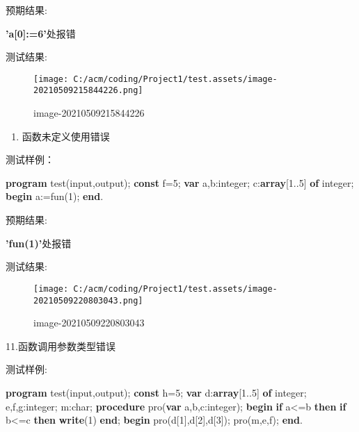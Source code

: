\documentclass[]{ctexart}
\newenvironment{Shaded}{}{}
\newcommand{\DataTypeTok}[1]{\textcolor[rgb]{0.56,0.13,0.00}{#1}}
\newcommand{\DecValTok}[1]{\textcolor[rgb]{0.25,0.63,0.44}{#1}}
\newcommand{\KeywordTok}[1]{\textcolor[rgb]{0.00,0.44,0.13}{\textbf{#1}}}
\newcommand{\NormalTok}[1]{#1}
\begin{document}
\begin{enumerate}
  预期结果:

  \textbf{'a{[}0{]}:=6'}处报错

  测试结果:

  \begin{figure}
  \centering
  \texttt{[image: C:/acm/coding/Project1/test.assets/image-20210509215844226.png]}
  \caption{image-20210509215844226}
  \end{figure}

  \begin{enumerate}
  \def\labelenumii{\arabic{enumii}.}
  \item
    函数未定义使用错误
  \end{enumerate}

  测试样例：

\begin{Shaded}
\begin{Highlighting}[]
\KeywordTok{program}\NormalTok{ test(input,output);  }
\KeywordTok{const}\NormalTok{ f=}\DecValTok{5}\NormalTok{;  }
\KeywordTok{var}\NormalTok{ a,b:}\DataTypeTok{integer}\NormalTok{;  }
\NormalTok{    c:}\KeywordTok{array}\NormalTok{[}\DecValTok{1}\NormalTok{..}\DecValTok{5}\NormalTok{] }\KeywordTok{of} \DataTypeTok{integer}\NormalTok{;    }
\KeywordTok{begin}  
\NormalTok{    a:=fun(}\DecValTok{1}\NormalTok{);}
\KeywordTok{end}\NormalTok{.}
\end{Highlighting}
\end{Shaded}

  预期结果:

  \textbf{'fun(1)'}处报错

  测试结果:

  \begin{figure}
  \centering
  \texttt{[image: C:/acm/coding/Project1/test.assets/image-20210509220803043.png]}
  \caption{image-20210509220803043}
  \end{figure}

  11.函数调用参数类型错误

  测试样例:

\begin{Shaded}
\begin{Highlighting}[]
\KeywordTok{program}\NormalTok{ test(input,output);  }
\KeywordTok{const}\NormalTok{ h=}\DecValTok{5}\NormalTok{;  }
\KeywordTok{var}\NormalTok{ d:}\KeywordTok{array}\NormalTok{[}\DecValTok{1}\NormalTok{..}\DecValTok{5}\NormalTok{] }\KeywordTok{of} \DataTypeTok{integer}\NormalTok{;  }
\NormalTok{    e,f,g:}\DataTypeTok{integer}\NormalTok{; }
\NormalTok{	m:}\DataTypeTok{char}\NormalTok{; }
\KeywordTok{procedure}\NormalTok{ pro(}\KeywordTok{var}\NormalTok{ a,b,c:}\DataTypeTok{integer}\NormalTok{);}
\KeywordTok{begin}  
    \KeywordTok{if}\NormalTok{ a<=b }\KeywordTok{then}  
        \KeywordTok{if}\NormalTok{ b<=c }\KeywordTok{then}  
            \KeywordTok{write}\NormalTok{(}\DecValTok{1}\NormalTok{)   }
\KeywordTok{end}\NormalTok{;  }
\KeywordTok{begin} 
\NormalTok{    pro(d[}\DecValTok{1}\NormalTok{],d[}\DecValTok{2}\NormalTok{],d[}\DecValTok{3}\NormalTok{]);}
\NormalTok{	pro(m,e,f);}
\KeywordTok{end}\NormalTok{. }
\end{Highlighting}
\end{Shaded}


\end{enumerate}
\end{document}
